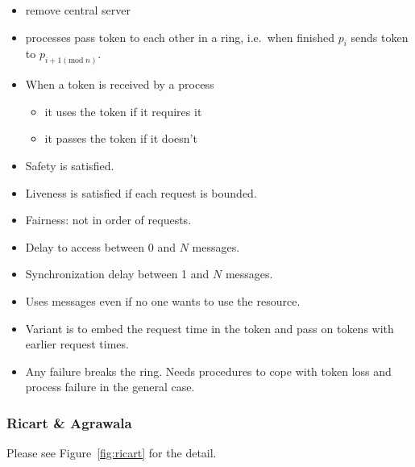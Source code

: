 \documentclass[twocolumn,landscape,10pt]{article}
\theoremstyle{definition}
\begin{document}
\begin{itemize}
    \item remove central server
    \item processes pass token to each other in a ring, i.e.\ when finished
        $p_i$ sends token to $p_{i+1(\text{mod}\;n)}$.
    \item When a token is received by a process
        \begin{itemize}
            \item it uses the token if it requires it
            \item it passes the token if it doesn't
        \end{itemize} 
\end{itemize} 


\begin{itemize}
    \item Safety is satisfied.
    \item Liveness is satisfied if each request is bounded.
    \item Fairness: not in order of requests.
\end{itemize} 


\begin{itemize}
    \item Delay to access between 0 and $N$ messages.
    \item Synchronization delay between 1 and $N$ messages.
    \item Uses messages even if no one wants to use the resource.
\end{itemize} 


\begin{itemize}
    \item Variant is to embed the request time in the token and pass on tokens
        with earlier request times.
    \item Any failure breaks the ring. Needs procedures to cope with token loss
        and process failure in the general case.
\end{itemize} 

\subsubsection{Ricart \& Agrawala}

Please see Figure~\ref{fig:ricart} for the detail.
\end{document}
